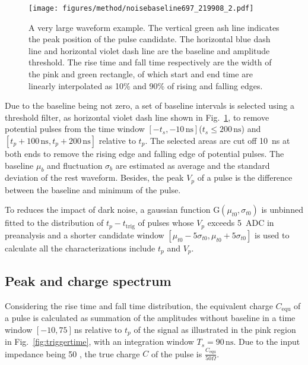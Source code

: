 \begin{figure}[!htbp]
    \centering
    \texttt{[image: figures/method/noisebaseline697\_219908\_2.pdf]}
    \caption{A very large waveform example. The vertical green ash line indicates the peak position of the pulse candidate. The horizontal blue dash line and horizontal violet dash line are the baseline and amplitude threshold. The rise time and fall time respectively are the width of the pink and green rectangle, of which start and end time are linearly interpolated as 10\% and 90\% of rising and falling edges.}
    \label{fig:baseline1}
\end{figure}

Due to the baseline being not zero, a set of baseline intervals is selected using a threshold filter, as horizontal violet dash line shown in Fig.~\ref{fig:baseline1}, to remove potential pulses from the time window $[-t_s,-10\,\mathrm{ns}]$($t_s\leq200\,\mathrm{ns}$) and $[t_p+100\,\mathrm{ns},t_p+200\,\mathrm{ns}]$ relative to $t_p$. The selected areas are cut off \SI{10}{ns} at both ends to remove the rising edge and falling edge of potential pulses. The baseline $\mu_b$ and fluctuation $\sigma_b$ are estimated as average and the standard deviation of the rest waveform. Besides, the peak $V_p$ of a pulse is the difference between the baseline and minimum of the pulse. 

To reduces the impact of dark noise, a gaussian function G$(\mu_{t0},\sigma_{t0})$ is unbinned fitted to the distribution of $t_p-t_{\mathrm{trig}}$ of pulses whose $V_p$ exceeds \SI{5}{ADC} in preanalysis and a shorter candidate window $[\mu_{t0}-5\sigma_{t0}, \mu_{t0}+5\sigma_{t0}]$ is used to calculate all the characterizations include $t_p$ and $V_p$.

\subsection{Peak and charge spectrum}
\label{sec:noisepeak}

Considering the rise time and fall time distribution, the equivalent charge $C_{\mathrm{equ}}$ of a pulse is calculated as summation of the amplitudes without baseline in a time window $[-10, 75]$\,ns relative to $t_p$ of the signal as illustrated in the pink region in Fig.~\ref{fig:triggertime}, with an integration window $T_s=90\,\mathrm{ns}$. Due to the input impedance being \SI{50}{\Omega} \cite{CAENV1751}, the true charge $C$ of the pulse is $\frac{C_{\mathrm{equ}}}{50 \Omega}$.

